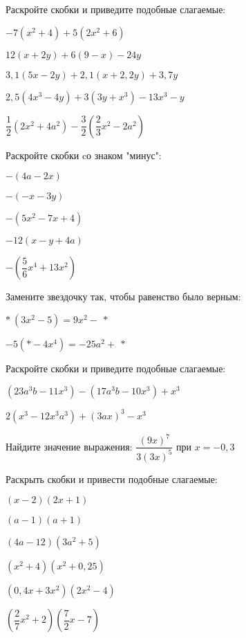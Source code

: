 \begin{class}[type=class, number=2]
	\begin{listofex}
		\item Раскройте скобки и приведите подобные слагаемые:
		\begin{enumcols}[itemcolumns=2]
			\item \( -7(x^2+4)+5(2x^2+6) \)
			\item \( 12(x+2y)+6(9-x)-24y \)
			\item \( 3,1(5x-2y)+2,1(x+2,2y)+3,7y \)
			\item \( 2,5(4x^3-4y)+3(3y+x^3)-13x^3-y\)
			\item \( \dfrac{1}{2}\left( 2x^2+4a^2 \right)-\dfrac{3}{2}\left( \dfrac{2}{3}x^2-2a^2 \right) \)
		\end{enumcols}
		\item Раскройте скобки cо знаком "минус":
		\begin{enumcols}[itemcolumns=3]
			\item \( -(4a-2x) \)
			\item \( -(-x-3y) \)
			\item \( -(5x^2-7x+4) \)
			\item \( -12(x-y+4a) \)
			\item \( -\left( \dfrac{5}{6}x^4+13x^2 \right) \)
		\end{enumcols}
		\item Замените звездочку так, чтобы равенство было верным:
		\begin{enumcols}[itemcolumns=2]
			\item \( *\:(3x^2-5)=9x^2-\:* \)
			\item \( -5(*-4x^4)=-25a^2+\:* \)
		\end{enumcols}
		\item Раскройте скобки и приведите подобные слагаемые:
		\begin{enumcols}[itemcolumns=2]
			\item \( (23a^3b-11x^3)-(17a^3b-10x^3)+x^3 \)
			\item \( 2(x^3-12x^3a^3)+(3ax)^3-x^3 \)
		\end{enumcols}
		\item Найдите значение выражения: \( \dfrac{(9x)^7}{3(3x)^5} \) при \( x=-0,3 \)
		\item Раскрыть скобки и привести подобные слагаемые:
		\begin{enumcols}[itemcolumns=3]
			\item \( (x-2)(2x+1) \)
			\item \( (a-1)(a+1) \)
			\item \( (4a-12)(3a^2+5) \)
			\item \( (x^2+4)(x^2+0,25) \)
			\item \( (0,4x+3x^2)(2x^2-4) \)
			\item \( \left( \dfrac{2}{7}x^2+2 \right)\left( \dfrac{7}{2}x-7 \right) \)
		\end{enumcols}
	\end{listofex}
\end{class}
